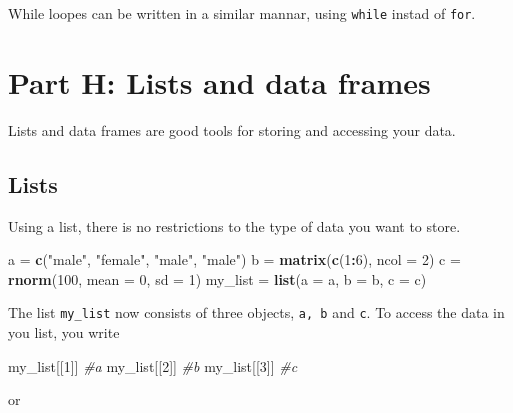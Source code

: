 \documentclass[]{article}
\newenvironment{Shaded}{\begin{snugshade}}{\end{snugshade}}
\newcommand{\KeywordTok}[1]{\textcolor[rgb]{0.13,0.29,0.53}{\textbf{#1}}}
\newcommand{\DataTypeTok}[1]{\textcolor[rgb]{0.13,0.29,0.53}{#1}}
\newcommand{\DecValTok}[1]{\textcolor[rgb]{0.00,0.00,0.81}{#1}}
\newcommand{\StringTok}[1]{\textcolor[rgb]{0.31,0.60,0.02}{#1}}
\newcommand{\CommentTok}[1]{\textcolor[rgb]{0.56,0.35,0.01}{\textit{#1}}}
\newcommand{\OperatorTok}[1]{\textcolor[rgb]{0.81,0.36,0.00}{\textbf{#1}}}
\newcommand{\NormalTok}[1]{#1}
\begin{document}
While loopes can be written in a similar mannar, using \texttt{while}
instad of \texttt{for}.

\section{Part H: Lists and data
frames}\label{part-h-lists-and-data-frames}

Lists and data frames are good tools for storing and accessing your
data.

\subsection{Lists}\label{lists}

Using a list, there is no restrictions to the type of data you want to
store.

\begin{Shaded}
\begin{Highlighting}[]
\NormalTok{a =}\StringTok{ }\KeywordTok{c}\NormalTok{(}\StringTok{"male"}\NormalTok{, }\StringTok{"female"}\NormalTok{, }\StringTok{"male"}\NormalTok{, }\StringTok{"male"}\NormalTok{)}
\NormalTok{b =}\StringTok{ }\KeywordTok{matrix}\NormalTok{(}\KeywordTok{c}\NormalTok{(}\DecValTok{1}\OperatorTok{:}\DecValTok{6}\NormalTok{), }\DataTypeTok{ncol =} \DecValTok{2}\NormalTok{)}
\NormalTok{c =}\StringTok{ }\KeywordTok{rnorm}\NormalTok{(}\DecValTok{100}\NormalTok{, }\DataTypeTok{mean =} \DecValTok{0}\NormalTok{, }\DataTypeTok{sd =} \DecValTok{1}\NormalTok{)}
\NormalTok{my_list =}\StringTok{ }\KeywordTok{list}\NormalTok{(}\DataTypeTok{a =}\NormalTok{ a, }\DataTypeTok{b =}\NormalTok{ b, }\DataTypeTok{c =}\NormalTok{ c)}
\end{Highlighting}
\end{Shaded}

The list \texttt{my\_list} now consists of three objects, \texttt{a,\ b}
and \texttt{c}. To access the data in you list, you write

\begin{Shaded}
\begin{Highlighting}[]
\NormalTok{my_list[[}\DecValTok{1}\NormalTok{]]  }\CommentTok{#a}
\NormalTok{my_list[[}\DecValTok{2}\NormalTok{]]  }\CommentTok{#b}
\NormalTok{my_list[[}\DecValTok{3}\NormalTok{]]  }\CommentTok{#c}
\end{Highlighting}
\end{Shaded}

or

\begin{Shaded}
\end{Shaded}
\end{document}
